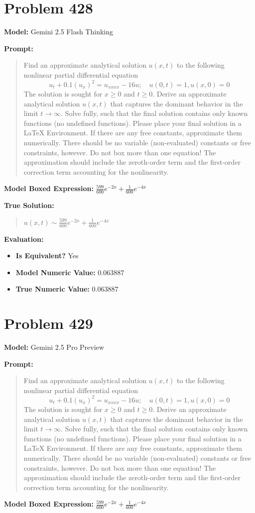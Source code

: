 \documentclass{article}
\begin{document}
\section*{Problem 428}
\textbf{Model:} Gemini 2.5 Flash Thinking

\textbf{Prompt:}
\begin{quote}
Find an approximate analytical solution $u(x, t)$ to the following nonlinear partial differential equation $$u_t + 0.1 (u_x)^2 = u_{xxxx} - 16 u; \quad u(0, t) = 1, u(x, 0) = 0 $$ The solution is sought for $x \ge 0$ and $t \ge 0$. Derive an approximate analytical solution $u(x, t)$ that captures the dominant behavior in the limit $t \to \infty$. Solve fully, such that the final solution contains only known functions (no undefined functions). Please place your final solution in a \boxed{} LaTeX Environment. If there are any free constants, approximate them numerically. There should be no variable (non-evaluated) constants or free constraints, however. Do not box more than one equation! The approximation should include the zeroth-order term and the first-order correction term accounting for the nonlinearity.
\end{quote}
\textbf{Model Boxed Expression:} $\frac{599}{600}e^{-2x} + \frac{1}{600}e^{-4x}$

\textbf{True Solution:}
\begin{quote}
$u(x, t) \sim \frac{599}{600}e^{-2x} + \frac{1}{600}e^{-4x}$
\end{quote}

\textbf{Evaluation:}
\begin{itemize}
\item \textbf{Is Equivalent?} Yes
\item \textbf{Model Numeric Value:} 0.063887
\item \textbf{True Numeric Value:} 0.063887
\end{itemize}
\vspace{1cm}
\section*{Problem 429}
\textbf{Model:} Gemini 2.5 Pro Preview

\textbf{Prompt:}
\begin{quote}
Find an approximate analytical solution $u(x, t)$ to the following nonlinear partial differential equation $$u_t + 0.1 (u_x)^2 = u_{xxxx} - 16 u; \quad u(0, t) = 1, u(x, 0) = 0 $$ The solution is sought for $x \ge 0$ and $t \ge 0$. Derive an approximate analytical solution $u(x, t)$ that captures the dominant behavior in the limit $t \to \infty$. Solve fully, such that the final solution contains only known functions (no undefined functions). Please place your final solution in a \boxed{} LaTeX Environment. If there are any free constants, approximate them numerically. There should be no variable (non-evaluated) constants or free constraints, however. Do not box more than one equation! The approximation should include the zeroth-order term and the first-order correction term accounting for the nonlinearity.
\end{quote}
\textbf{Model Boxed Expression:} $\frac{599}{600}e^{-2x} + \frac{1}{600}e^{-4x}$
\end{document}

